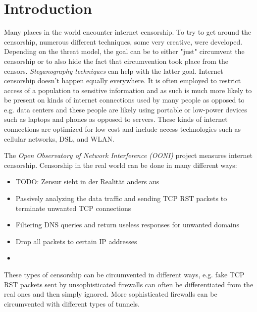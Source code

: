 
\chapter{Introduction}


Many places in the world encounter internet censorship.
To try to get around the censorship, numerous different techniques, some very creative, were developed.
Depending on the threat model, the goal can be to either "just" circumvent the censorship or to also hide the fact that circumvention took place from the censors.
\textit{Steganography} \cite{wiki:Steganography} \textit{techniques} \cite{wiki:List_of_steganography_techniques} can help with the latter goal.
Internet censorship doesn't happen equally everywhere.
It is often employed to restrict access of a population to sensitive information and as such is much more likely to be present on kinds of internet connections used by many people as opposed to e.g. data centers and these people are likely using portable or low-power devices such as laptops and phones as opposed to servers.
These kinds of internet connections are optimized for low cost and include access technologies such as cellular networks, DSL, and WLAN.


The \textit{Open Observatory of Network Interference (OONI)} \cite{OONI} project measures internet censorship.
Censorship in the real world can be done in many different ways:
\begin{itemize}
  \item TODO: Zensur sieht in der Realität anders aus
  \item Passively analyzing the data traffic and sending TCP RST packets to terminate unwanted TCP connections
  \item Filtering DNS queries and return useless responses for unwanted domains
  \item Drop all packets to certain IP addresses
  \item {}
\end{itemize}
These types of censorship can be circumvented in different ways, e.g. fake TCP RST packets sent by unsophisticated firewalls can often be differentiated from the real ones and then simply ignored. More sophisticated firewalls can be circumvented with different types of tunnels.

